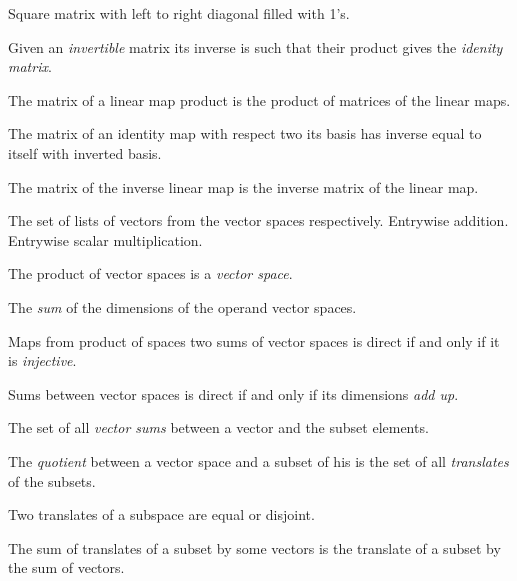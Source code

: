 \begin{multicols}{3}
  Square matrix with left to right diagonal filled with 1's.

  Given an \textit{invertible} matrix its inverse is such that their product gives the \textit{idenity matrix}.

  The matrix of a linear map product is the product of matrices of the linear maps.
  
  The matrix of an identity map with respect two its basis
  has inverse equal to itself with inverted basis.
  
  
  The matrix of the inverse linear map is the inverse matrix of the linear map.


  The set of lists of vectors from the vector spaces respectively.
  Entrywise addition.
  Entrywise scalar multiplication.

  The product of vector spaces is a \textit{vector space}.

  The \textit{sum} of the dimensions of the operand vector spaces.

  Maps from product of spaces two sums of vector spaces is direct if and only if it is \textit{injective}.

  Sums between vector spaces is direct if and only if its dimensions \textit{add up}.

  The set of all \textit{vector sums} between a vector and the subset elements.

  The \textit{quotient} between a vector space and a subset of his is the set of all
  \textit{translates} of the subsets.

  Two translates of a subspace are equal or disjoint.

  The sum of translates of a subset by some vectors
  is the translate of a subset by the sum of vectors.
  

\end{multicols}
